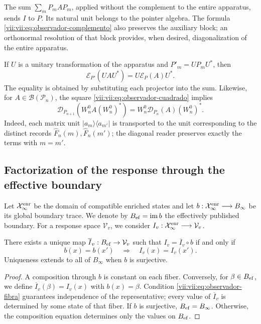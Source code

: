 The sum \(\sum_mP_mAP_m\), applied without the complement to the entire
apparatus, sends \(I\) to \(P\). Its natural unit belongs to the pointer
algebra. The formula \eqref{vii:vii:eq:observador-complemento} also preserves
the auxiliary block; an orthonormal resolution of that block
provides, when desired, diagonalization of the entire apparatus.

If \(U\) is a unitary transformation of the apparatus and
\(P'_m=UP_mU^*\), then
\[
 \mathcal E_{P'}(UAU^*)=U\mathcal E_P(A)U^*.
\]
The equality is obtained by substituting each projector into the sum.
Likewise, for \(A\in\mathcal B(\mathcal P_n)\), the square
\eqref{vii:vii:eq:observador-cuadrado} implies
\[
 \mathcal D_{P_{n+1}}(W_n^0A(W_n^0)^*)
 =W_n^0\mathcal D_{P_n}(A)(W_n^0)^*.
\]
Indeed, each matrix unit \(|a_m\rangle\langle a_{m'}|\)
is transported to the unit corresponding to the distinct records
\(\widehat F_n(m),\widehat F_n(m')\); the diagonal reader preserves
exactly the terms with \(m=m'\).

\subsection{Factorization of the response through the effective boundary}
\label{vii:vii:sec:observador-factorizacion}

Let \(\mathcal X_\infty^{\rm enr}\) be the domain of compatible enriched
states and let
\(b:\mathcal X_\infty^{\rm enr}\longrightarrow B_\infty\) be its global
boundary trace. We denote by \(B_{\rm ef}=\operatorname{im}b\)
the effectively published boundary. For a response space
\(\mathcal V_v\), we consider
\(I_v:\mathcal X_\infty^{\rm enr}\longrightarrow\mathcal V_v\).

\begin{theorem}
\label{vii:vii:thm:observador-factorizacion}
There exists a unique map \(\overline I_v:B_{\rm ef}\to\mathcal V_v\)
such that \(I_v=\overline I_v\circ b\) if and only if
\begin{equation}
 b(x)=b(x')\quad\Longrightarrow\quad I_v(x)=I_v(x').
 \label{vii:vii:eq:observador-fibra}
\end{equation}
Uniqueness extends to all of \(B_\infty\) when \(b\) is
surjective.
\end{theorem}

\begin{proof}
A composition through \(b\) is constant on each fiber. Conversely,
for \(\beta\in B_{\rm ef}\), we define
\(\overline I_v(\beta)=I_v(x)\) with \(b(x)=\beta\).
Condition \eqref{vii:vii:eq:observador-fibra} guarantees independence
of the representative; every value of \(\overline I_v\) is determined
by some state of that fiber. If \(b\) is surjective,
\(B_{\rm ef}=B_\infty\). Otherwise, the composition equation
determines only the values on \(B_{\rm ef}\).
\end{proof}

